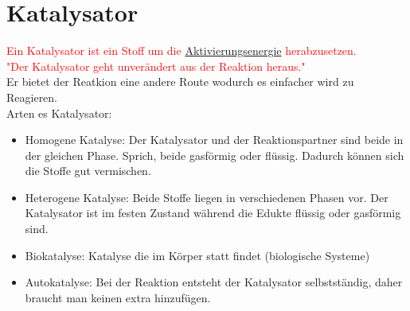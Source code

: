 
\section{Katalysator} \label{sec:katalysator}
\textcolor{red}{Ein Katalysator ist ein Stoff um die \hyperref[sec:aktivierungsenergie]{Aktivierungsenergie} herabzusetzen.}  \\
\textcolor{red}{"Der Katalysator geht unverändert aus der Reaktion heraus."} \\
Er bietet der Reatkion eine andere Route wodurch es einfacher wird zu Reagieren.\\
Arten es Katalysator: \\
\begin{itemize}
    \item Homogene Katalyse: 
        Der Katalysator und der Reaktionspartner sind beide in der gleichen Phase. 
        Sprich, beide gasförmig oder flüssig. 
        Dadurch können sich die Stoffe gut vermischen.
    \item Heterogene Katalyse: 
        Beide Stoffe liegen in verschiedenen Phasen vor. 
        Der Katalysator ist im festen Zustand während die Edukte flüssig oder gasförmig sind.
    \item Biokatalyse:
        Katalyse die im Körper statt findet (biologische Systeme)
    \item Autokatalyse: 
        Bei der Reaktion entsteht der Katalysator selbstständig, daher braucht man keinen extra hinzufügen.
\end{itemize}

